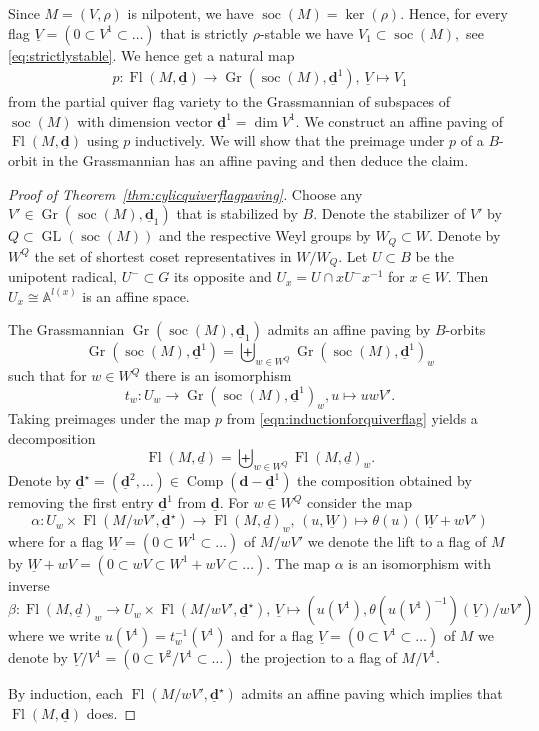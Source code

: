 \documentclass{amsart}
\theoremstyle{plain}
\theoremstyle{TheoremNum}
\theoremstyle{definition}
\theoremstyle{remark}
\numberwithin{equation}{section}
\newcommand{\GL}{\operatorname{GL}}
\newcommand{\Fl}{\operatorname{Fl}}
\newcommand{\Gr}{\operatorname{Gr}}
\newcommand{\soc}{\operatorname{soc}}
\newcommand{\Comp}{\operatorname{Comp}}
\begin{document}
Since $M=(V,\rho)$ is nilpotent, we have $\soc(M)=\ker(\rho).$ Hence, for every flag $\underline{V}=(0\subset V^1\subset\dots)$ that is strictly $\rho$-stable we have $V_1\subset \soc(M),$ see \eqref{eq:strictlystable}. We hence get a natural map
\begin{align}
    p:\Fl(M,\underline{\mathbf{d}})\to \Gr(\soc(M),\underline{\mathbf{d}}^1),\,\underline{V}\mapsto V_1\label{eqn:inductionforquiverflag}
\end{align}
from the partial quiver flag variety to the Grassmannian of subspaces of $\soc(M)$ with dimension vector $\underline{\mathbf{d}}^1=\dim V^1.$ We  construct an affine paving of $\Fl(M,\underline{\mathbf{d}})$ using $p$ inductively. We will show that the preimage under $p$ of a $B$-orbit in the Grassmannian has an affine paving and then deduce the claim.
\begin{proof}[Proof of Theorem~\ref{thm:cylicquiverflagpaving}]
Choose any $V'\in \Gr(\soc(M),\underline{\mathbf{d}}_1)$ that is stabilized by $B.$ Denote the stabilizer of $V'$ by $Q\subset \GL(\soc(M))$ and the respective Weyl groups by $W_Q\subset W.$ Denote by $W^Q$ the set of shortest coset representatives in $W/W_Q.$ 
Let $U\subset B$ be the unipotent radical, $U^-\subset G$ its opposite and $U_x=U\cap xU^-x^{-1}$ for $x\in W.$ Then $U_x\cong \mathbb{A}^{l(x)}$ is an affine space. 

The Grassmannian $\Gr(\soc(M),\underline{\mathbf{d}}_1)$ admits an affine paving by $B$-orbits
$$\Gr(\soc(M),\underline{\mathbf{d}}^1)=\biguplus_{w\in W^Q}\Gr(\soc(M),\underline{\mathbf{d}}^1)_w$$
such that for $w\in W^Q$ there is an isomorphism
$$t_w: U_w\to \Gr(\soc(M),\underline{\mathbf{d}}^1)_w, u\mapsto uwV'.$$
Taking preimages under the map $p$ from \eqref{eqn:inductionforquiverflag} yields a decomposition 
$$\Fl(M,\underline{d})=\biguplus_{w\in W^Q}\Fl(M,\underline{d})_w.$$
Denote by $\underline{\mathbf{d}}^\star=(\underline{\mathbf{d}}^2,\dots)\in \Comp(\mathbf{d}-\underline{\mathbf{d}}^1)$ the composition obtained by removing the first entry $\underline{\mathbf{d}}^1$ from $\underline{\mathbf{d}}.$ For $w\in W^Q$ consider the map
$$\alpha:U_w\times \Fl(M/wV',\underline{\mathbf{d}}^\star)\to \Fl(M,\underline{d})_w,\, (u,\underline{W})\mapsto \theta(u)(\underline{W}+wV')$$
where for a flag $\underline{W}=(0\subset W^1\subset\dots)$ of $M/wV'$ we denote the lift to a flag of $M$ by $\underline{W}+wV=(0\subset wV\subset W^1+wV\subset\dots).$ 
The map $\alpha$ is an isomorphism with inverse
$$\beta:\Fl(M,\underline{d})_w\to U_w\times \Fl(M/wV',\underline{\mathbf{d}}^\star),\, \underline{V}\mapsto(u(V^1), \theta(u(V^1)^{-1})(\underline{V})/wV')$$
where we write $u(V^1)=t_w^{-1}(V^1)$ and for a flag $\underline{V}=(0\subset V^1\subset\dots)$ of $M$ we denote by $\underline{V}/V^1=(0\subset V^2/V^1\subset \dots)$ the projection to a flag of $M/V^1.$

By induction, each $\Fl(M/wV',\underline{\mathbf{d}}^\star)$ admits an affine paving which implies that $\Fl(M,\underline{\mathbf{d}})$ does.
\end{proof}
\end{document}
